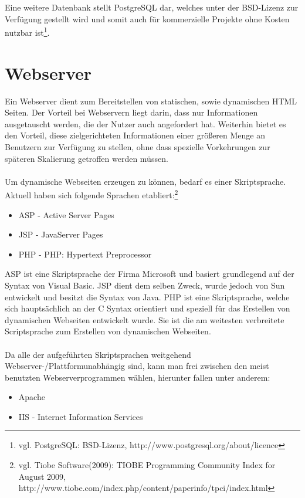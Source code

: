 Eine weitere Datenbank stellt PostgreSQL dar, welches unter der BSD-Lizenz zur Verfügung gestellt wird und somit auch für kommerzielle Projekte ohne Kosten nutzbar ist\footnote{vgl. PostgreSQL: BSD-Lizenz, http://www.postgresql.org/about/licence}.


\section{Webserver}
\label{sec:websrv}

Ein Webserver dient zum Bereitstellen von statischen, sowie dynamischen HTML Seiten.
Der Vorteil bei Webservern liegt darin, dass nur Informationen ausgetauscht werden, die der Nutzer auch angefordert hat.
Weiterhin bietet es den Vorteil, diese zielgerichteten Informationen einer größeren Menge an Benutzern zur Verfügung zu stellen, ohne dass spezielle Vorkehrungen zur späteren Skalierung getroffen werden müssen.\\\\
Um dynamische Webseiten erzeugen zu können, bedarf es einer Skriptsprache.
Aktuell haben sich folgende Sprachen etabliert:\footnote{vgl. Tiobe Software(2009): TIOBE Programming Community Index for August 2009, http://www.tiobe.com/index.php/content/paperinfo/tpci/index.html}

\begin{itemize}
\item ASP - Active Server Pages
\item JSP - JavaServer Pages
\item PHP - PHP: Hypertext Preprocessor
\end{itemize}

ASP ist eine Skriptsprache der Firma Microsoft und basiert grundlegend auf der Syntax von Visual Basic.
JSP dient dem selben Zweck, wurde jedoch von Sun entwickelt und besitzt die Syntax von Java.
PHP ist eine Skriptsprache, welche sich hauptsächlich an der C Syntax orientiert und speziell für das Erstellen von
dynamischen Webseiten entwickelt wurde. Sie ist die am weitesten verbreitete Scriptsprache zum Erstellen von dynamischen Webseiten.\\\\
Da alle der aufgeführten Skriptsprachen weitgehend Webserver-/Plattformunabhängig sind, kann man frei zwischen den meist benutzten Webserverprogrammen wählen, hierunter fallen unter anderem:


\begin{itemize}
\item Apache
\item IIS - Internet Information Services
\end{itemize}

